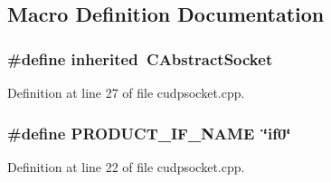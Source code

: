 \subsection{Macro Definition Documentation}
\subsubsection[{inherited}]{\setlength{\rightskip}{0pt plus 5cm}\#define inherited~C\-Abstract\-Socket}\label{cudpsocket_8cpp_a3920e3b7cb0909b941b2409493acf8f1}


Definition at line 27 of file cudpsocket.\-cpp.

\subsubsection[{P\-R\-O\-D\-U\-C\-T\-\_\-\-I\-F\-\_\-\-N\-A\-M\-E}]{\setlength{\rightskip}{0pt plus 5cm}\#define P\-R\-O\-D\-U\-C\-T\-\_\-\-I\-F\-\_\-\-N\-A\-M\-E~\char`\"{}if0\char`\"{}}\label{cudpsocket_8cpp_ab6459411f683e58127b336daedd2c0aa}


Definition at line 22 of file cudpsocket.\-cpp.

